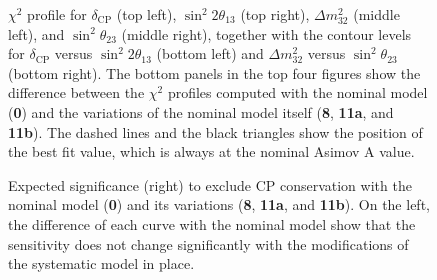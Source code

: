 \begin{figure}
	\centering
	\resizebox{0.49\linewidth}{!}{}
	\resizebox{0.49\linewidth}{!}{}
	\resizebox{0.49\linewidth}{!}{}
	\resizebox{0.49\linewidth}{!}{}
	\resizebox{0.49\linewidth}{!}{}	%
	\resizebox{0.49\linewidth}{!}{}	%
	\caption[$\chi^2$ profiles for $\delta_\text{CP}$, $\Delta m_{32}^2$, $\sin^2 2\theta_{13}$, and $\sin\theta_{23}$ %
		and contours for $\Delta m_{32}^2$ versus $\sin\theta_{23}$ and $\delta_\text{CP}$ versus $\sin^2 2\theta_{13}$ %
		with variations on the nominal systematic model]%
		{$\chi^2$ profile for $\delta_\text{CP}$ (top left), $\sin^2 2\theta_{13}$ (top right), %
		$\Delta m_{32}^2$ (middle left), and $\sin^2 \theta_{23}$ (middle right), %
		together with the contour levels for $\delta_\text{CP}$ versus $\sin^2 2\theta_{13}$ (bottom left) %
		and $\Delta m_{32}^2$ versus $\sin^2 \theta_{23}$ (bottom right).
		The bottom panels in the top four figures show the difference between the $\chi^2$ profiles computed %
		with the nominal model (\textbf{0}) and the variations of the nominal model itself %
		(\textbf{8}, \textbf{11a}, and \textbf{11b}).
		The dashed lines and the black triangles show the position of the best fit value, %
		which is always at the nominal Asimov A value.}
	\label{fig:0_11a_11b_8_profile}
\end{figure}

\begin{figure}
	\centering
	\resizebox{0.49\linewidth}{!}{}
	\resizebox{0.49\linewidth}{!}{}
	\caption[Sensitivity to $\delta_\text{CP} = 0$ with variations on the nominal systematic model]%
		{Expected significance (right) to exclude CP conservation with the nominal model (\textbf{0}) %
		and its variations (\textbf{8}, \textbf{11a}, and \textbf{11b}).
		On the left, the difference of each curve with the nominal model show that the sensitivity %
		does not change significantly with the modifications of the systematic model in place.}
	\label{fig:0_11a_11b_8_sensitivity}
\end{figure}


